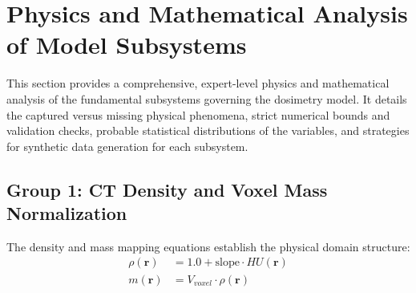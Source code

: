\documentclass[11pt,a4paper]{article}
\begin{document}
\section{Physics and Mathematical Analysis of Model Subsystems}

This section provides a comprehensive, expert-level physics and mathematical analysis of the fundamental subsystems governing the dosimetry model. It details the captured versus missing physical phenomena, strict numerical bounds and validation checks, probable statistical distributions of the variables, and strategies for synthetic data generation for each subsystem.

\subsection{Group 1: CT Density and Voxel Mass Normalization}

The density and mass mapping equations establish the physical domain structure:
\begin{align}
    \rho(\mathbf{r}) &= 1.0 + \text{slope} \cdot HU(\mathbf{r}) \label{eq:density_group1} \\
    m(\mathbf{r}) &= V_{voxel} \cdot \rho(\mathbf{r}) \label{eq:mass_group1}
\end{align}
\end{document}
